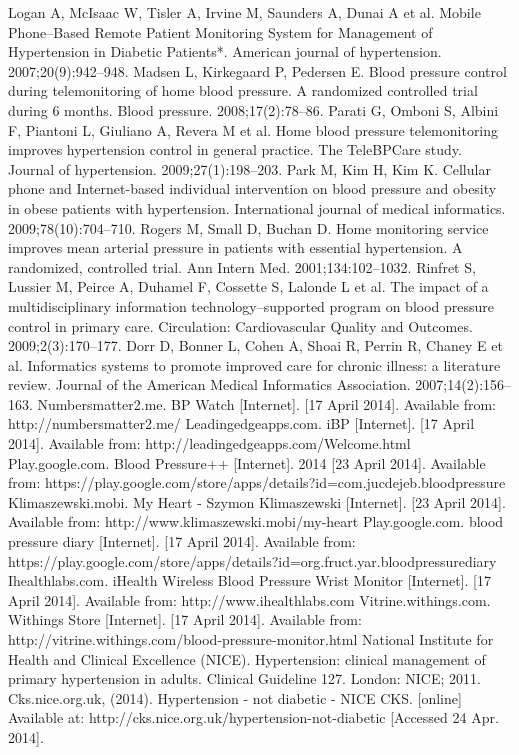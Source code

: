 \documentclass[11pt]{article}
\begin{document}
\begin{thebibliography}{40}
\begin{singlespace}
Logan A, McIsaac W, Tisler A, Irvine M, Saunders A, Dunai A et al. Mobile Phone--Based Remote Patient Monitoring System for Management of Hypertension in Diabetic Patients*. American journal of hypertension. 2007;20(9):942--948. 
Madsen L, Kirkegaard P, Pedersen E. Blood pressure control during telemonitoring of home blood pressure. A randomized controlled trial during 6 months. Blood pressure. 2008;17(2):78--86. 
Parati G, Omboni S, Albini F, Piantoni L, Giuliano A, Revera M et al. Home blood pressure telemonitoring improves hypertension control in general practice. The TeleBPCare study. Journal of hypertension. 2009;27(1):198--203. 
Park M, Kim H, Kim K. Cellular phone and Internet-based individual intervention on blood pressure and obesity in obese patients with hypertension. International journal of medical informatics. 2009;78(10):704--710. 
Rogers M, Small D, Buchan D. Home monitoring service improves mean arterial pressure in patients with essential hypertension. A randomized, controlled trial. Ann Intern Med. 2001;134:102--1032. 
 Rinfret S, Lussier M, Peirce A, Duhamel F, Cossette S, Lalonde L et al. The impact of a multidisciplinary information technology--supported program on blood pressure control in primary care. Circulation: Cardiovascular Quality and Outcomes. 2009;2(3):170--177. 
Dorr D, Bonner L, Cohen A, Shoai R, Perrin R, Chaney E et al. Informatics systems to promote improved care for chronic illness: a literature review. Journal of the American Medical Informatics Association. 2007;14(2):156--163. 
Numbersmatter2.me. BP Watch [Internet]. [17 April 2014]. Available from: http://numbersmatter2.me/
 Leadingedgeapps.com. iBP [Internet]. [17 April 2014]. Available from: http://leadingedgeapps.com/Welcome.html 
 Play.google.com. Blood Pressure++ [Internet]. 2014 [23 April 2014]. Available from: https://play.google.com/store/apps/details?id=com.jucdejeb.bloodpressure
Klimaszewski.mobi. My Heart - Szymon Klimaszewski [Internet]. [23 April 2014]. Available from: http://www.klimaszewski.mobi/my-heart
 Play.google.com. blood pressure diary [Internet]. [17 April 2014]. Available from: https://play.google.com/store/apps/details?id=org.fruct.yar.bloodpressurediary
Ihealthlabs.com. iHealth Wireless Blood Pressure Wrist Monitor [Internet]. [17 April 2014]. Available from: http://www.ihealthlabs.com
Vitrine.withings.com. Withings Store [Internet]. [17 April 2014]. Available from: http://vitrine.withings.com/blood-pressure-monitor.html
National Institute for Health and Clinical Excellence (NICE). Hypertension: clinical management of primary hypertension
in adults. Clinical Guideline 127. London: NICE; 2011.
Cks.nice.org.uk, (2014). Hypertension - not diabetic - NICE CKS. [online] Available at: http://cks.nice.org.uk/hypertension-not-diabetic [Accessed 24 Apr. 2014].

\end{singlespace} 
\end{thebibliography}
\end{document}
